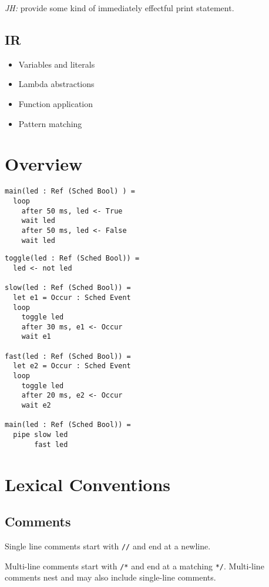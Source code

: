 \documentclass{article}
\begin{document}
\textit{JH:} provide some kind of immediately effectful print statement.

\subsection{IR}

\begin{itemize}
\item Variables and literals
\item Lambda abstractions
\item Function application
\item Pattern matching
\end{itemize}

\section{Overview}

\begin{lstlisting}
main(led : Ref (Sched Bool) ) =
  loop
    after 50 ms, led <- True
    wait led
    after 50 ms, led <- False
    wait led
\end{lstlisting}

\begin{lstlisting}
toggle(led : Ref (Sched Bool)) =
  led <- not led

slow(led : Ref (Sched Bool)) =
  let e1 = Occur : Sched Event
  loop
    toggle led
    after 30 ms, e1 <- Occur
    wait e1

fast(led : Ref (Sched Bool)) =
  let e2 = Occur : Sched Event
  loop
    toggle led
    after 20 ms, e2 <- Occur
    wait e2
    
main(led : Ref (Sched Bool)) =
  pipe slow led
       fast led
\end{lstlisting}

\section{Lexical Conventions}

\subsection{Comments}

Single line comments start with \lstinline!//! and end at a newline.

Multi-line comments start with \lstinline!/*! and end at a matching
\lstinline!*/!.  Multi-line comments nest and may also include
single-line comments.
\end{document}
